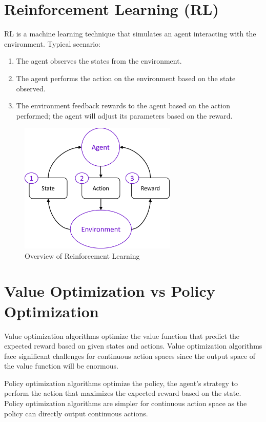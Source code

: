 \section{Reinforcement Learning (RL)}
RL is a machine learning technique that simulates an agent interacting with the environment. Typical scenario:
    \begin{enumerate}
        \item The agent observes the states from the environment.
        \item The agent performs the action on the environment based on the state observed.
        \item The environment feedback rewards to the agent based on the action performed; the agent will adjust its parameters based on the reward. 
    \end{enumerate}
\begin{figure}[ht]
  \centering\includegraphics[width=7.5cm]{images/rl_overview.png}
  \caption [Overview of Reinforcement Learning]
  {Overview of Reinforcement Learning
  }
  \label{fig:rl_overview_diagram}
\end{figure}

\section{Value Optimization vs Policy Optimization}
Value optimization algorithms optimize the value function that predict the expected reward based on given states and actions. Value optimization algorithms face significant challenges for continuous action spaces since the output space of the value function will be enormous.
\par
Policy optimization algorithms optimize the policy, the agent's strategy to perform the action that maximizes the expected reward based on the state. Policy optimization algorithms are simpler for continuous action space as the policy can directly output continuous actions.
